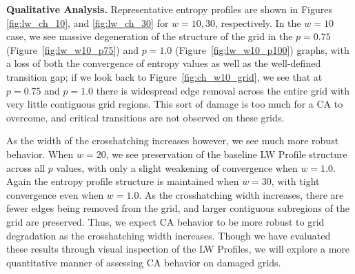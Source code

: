 \documentclass[a4paper,11pt]{article}
\begin{document}
\medskip

\noindent \textbf{Qualitative Analysis.} Representative entropy profiles are shown in Figures \ref{fig:lw_ch_10}, and \ref{fig:lw_ch_30} for \linebreak $w=10,30$, respectively. In the $w=10$ case, we see massive degeneration of the structure of the grid in the $p=0.75$ (Figure~\ref{fig:lw_w10_p75}) and $p=1.0$ (Figure~\ref{fig:lw_w10_p100}) graphs, with a loss of both the convergence of entropy values as well as the well-defined transition gap; if we look back to Figure~\ref{fig:ch_w10_grid}, we see that at $p=0.75$ and $p=1.0$ there is widespread edge removal across the entire grid with very little contiguous grid regions. This sort of damage is too much for a CA to overcome, and critical transitions are not observed on these grids.

As the width of the crosshatching increases however, we see much more robust behavior. When $w=20$, we see preservation of the baseline LW Profile structure across all $p$ values, with only a slight weakening of convergence when $w=1.0$. Again the entropy profile structure is maintained when $w=30$, with tight convergence even when $w=1.0$. As the crosshatching width increases, there are fewer edges being removed from the grid, and larger contiguous subregions of the grid are preserved. Thus, we expect CA behavior to be more robust to grid degradation as the crosshatching width increases. Though we have evaluated these results through visual inspection of the LW Profiles, we will explore a more quantitative manner of assessing CA behavior on damaged grids.
\end{document}
